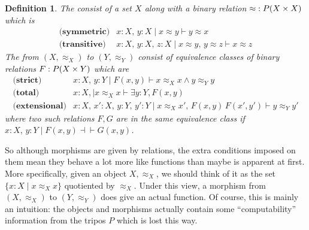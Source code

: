\documentclass[11pt]{article}
\newtheorem{defn}[thrm]{Definition}
\begin{document}
\begin{defn}\label{defn-appendix-realizability-topos}
  The  consist of a set \(X\)
  along with a binary relation \({\approx} : P({X}\times{X})\) which is
  \[\begin{array}{ll}
    \textbf{(symmetric)}& x:X,\,y:X \mid x \approx y \vdash y \approx x\\
    \textbf{(transitive)}& x:X,\,y:X,\,z:X \mid x \approx y,\,y \approx z \vdash x \approx z
  \end{array}\]
  The 
  from \((X,{ \approx_{X} })\) to \((Y,{ \approx_{Y} })\) consist of
  equivalence classes of binary relations \(F : P({X}\times{Y})\) which are
  \[\begin{array}{ll}
      \textbf{(strict)}& x:X,\,y:Y \mid
                         F(x,y) \vdash
                         x\approx_{X}x \land y\approx_{Y}y\\
      \textbf{(total)}& x:X, \mid
                         x\approx_{X}x \vdash
                         \exists y:Y, F(x,y)\\
      \textbf{(extensional)}&
                              x:X,\,x':X,\,y:Y,\,y':Y \mid
                              x\approx_{X}x',\,F(x,y)\,F(x',y') \vdash
                              y\approx_{Y}y'
  \end{array}\]
  where two such relations \(F,G\) are in the same equivalence class if
  \(x:X,\,y:Y\mid F(x,y) \dashv\vdash G(x,y)\).
\end{defn}

So although morphisms are given by relations, the extra conditions imposed on
them mean they behave a lot more like functions than maybe is apparent at first.
%
More specifically, given an object \(X,\approx_{X}\), we should think of it as
the set \(\{x : X \mid x\approx_{X}x\}\) quotiented by \(\approx_{X}\).
%
Under this view, a morphism from \((X,\approx_X)\) to \((Y,\approx_Y)\)
does give an actual function.
%
Of course, this is mainly an intuition: the objects and morphisms actually
contain some ``computability'' information from the tripos \(P\) which is lost
this way.
\end{document}
